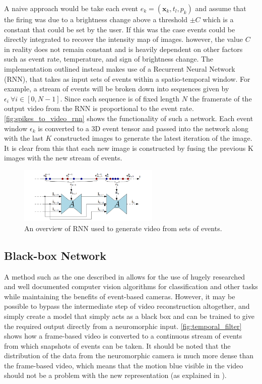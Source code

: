 A naive approach would be take each event $ e_k = (\boldsymbol{\mathbf{x}}_k, t_l, p_k ) $ and assume that the firing was due to a brightness change above a threshold $ \pm C $ which is a constant that could be set by the user. If this was the case events could be directly integrated to recover the intensity map of images. however, the value $ C $ in reality does not remain constant and is heavily dependent on other factors such as event rate, temperature, and sign of brightness change. The implementation outlined instead makes use of a Recurrent Neural Network (RNN), that takes as input sets of events within a spatio-temporal window. For example, a stream of events will be broken down into sequences given by $ \epsilon_i \: \forall i \in [0, N-1] $. Since each sequence is of fixed length $ N $ the framerate of the output video from the RNN is proportional to the event rate. \autoref{fig:spikes_to_video_rnn} shows the functionality of such a network. Each event window $ \epsilon_k $ is converted to a 3D event tensor and passed into the network along with the last $ K $ constructed images to generate the latest iteration of the image. It is clear from this that each new image is constructed by fusing the previous K images with the new stream of events.

\begin{figure}[htb]
      \centering
      \includegraphics[width=0.6\textwidth]{background/images/spikes_to_video_rnn.png}
      \caption{An overview of RNN used to generate video from sets of events\cite{spikingToVideo}.}
      \label{fig:spikes_to_video_rnn}
\end{figure}

\subsection{Black-box Network}

A method such as the one described in  allows for the use of hugely researched and well documented computer vision algorithms for classification and other tasks while maintaining the benefits of event-based cameras. However, it may be possible to bypass the intermediate step of video reconstruction altogether, and simply create a model that simply acts as a black box and can be trained to give the required output directly from a neuromorphic input. \autoref{fig:temporal_filter} shows how a frame-based video is converted to a continuous stream of events from which snapshots of events can be taken. It should be noted that the distribution of the data from the neuromorphic camera is much more dense than the frame-based video, which means that the motion blue visible in the video should not be a problem with the new representation (as explained in ).


